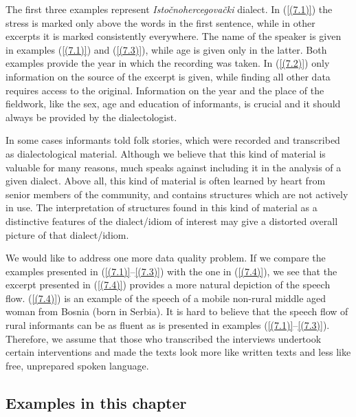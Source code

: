 \noindent The first three examples represent \textit{Istočnohercegovački} dialect. In (\ref{(7.1)}) the stress is marked only above the words in the first sentence, while in other excerpts it is marked consistently everywhere. The name of the speaker is given in examples (\ref{(7.1)}) and (\ref{(7.3)}), while age is given only in the latter. Both examples provide the year in which the recording was taken. In (\ref{(7.2)}) only information on the source of the excerpt is given, while finding all other data requires access to the original. Information on the year and the place of the fieldwork, like the sex, age and education of informants, is crucial and it should always be provided by the dialectologist. 

In some cases informants told folk stories, which were recorded and transcribed as dialectological material. Although we believe that this kind of material is valuable for many reasons, much speaks against including it in the analysis of a given dialect. Above all, this kind of material is often learned by heart from senior members of the community, and contains structures which are not actively in use. The interpretation of structures found in this kind of material as a distinctive features of the dialect/idiom of interest may give a distorted overall picture of that dialect/idiom. 

We would like to address one more data quality problem. If we compare the examples presented in (\ref{(7.1)}--\ref{(7.3)}) with the one in (\ref{(7.4)}), we see that the excerpt presented in (\ref{(7.4)}) provides a more natural depiction of the speech flow. (\ref{(7.4)}) is an example of the speech of a mobile non-rural middle aged woman from Bosnia (born in Serbia). It is hard to believe that the speech flow of rural informants can be as fluent as is presented in examples (\ref{(7.1)}--\ref{(7.3)}). Therefore, we assume that those who transcribed the interviews undertook certain interventions and made the texts look more like written texts and less like free, unprepared spoken language.   

\subsection{Examples in this chapter}

